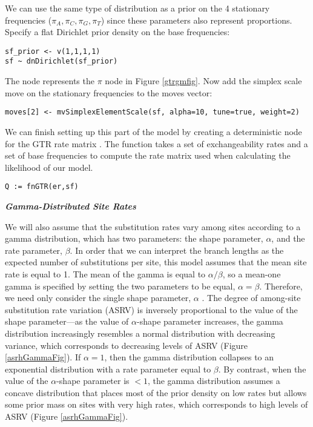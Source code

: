 We can use the same type of distribution as a prior on the 4 stationary frequencies ($\pi_A, \pi_C, \pi_G, \pi_T$) since these parameters also represent proportions. 
Specify a flat Dirichlet prior density on the base frequencies:
{\tt \begin{snugshade*}
\begin{lstlisting}
sf_prior <- v(1,1,1,1) 
sf ~ dnDirichlet(sf_prior)
\end{lstlisting}
\end{snugshade*}}

The node  represents the $\pi$ node in Figure \ref{gtrgmfig}.
Now add the simplex scale move on the stationary frequencies to the moves vector:
{\tt \small \begin{snugshade*}
\begin{lstlisting}
moves[2] <- mvSimplexElementScale(sf, alpha=10, tune=true, weight=2)  
\end{lstlisting}
\end{snugshade*}}

We can finish setting up this part of the model by creating a deterministic node for the GTR rate matrix . 
The  function takes a set of exchangeability rates and a set of base frequencies to compute the rate matrix used when calculating the likelihood of our model.
{\tt \begin{snugshade*}
\begin{lstlisting}
Q := fnGTR(er,sf)
\end{lstlisting}
\end{snugshade*}}


\textbf{\textit{Gamma-Distributed Site Rates}}


We will also assume that the substitution rates vary among sites according to a gamma distribution, which has two parameters: the shape parameter, $\alpha$, and the rate parameter, $\beta$. 
In order that we can interpret the branch lengths as the expected number of substitutions per site, this model assumes that the mean site rate is equal to 1.
The mean of the gamma is equal to $\alpha/\beta$, so a mean-one gamma is specified by setting the two parameters to be equal, $\alpha=\beta$.
Therefore, we need only consider the single shape parameter, $\alpha$ \citep{yang94a}. 
The degree of among-site substitution rate variation (ASRV) is inversely proportional to the value of the shape parameter---as the value of $\alpha$-shape parameter increases, the gamma distribution increasingly resembles a normal distribution with decreasing variance, which corresponds to decreasing levels of ASRV (Figure \ref{asrhGammaFig}).
If $\alpha = 1$, then the gamma distribution collapses to an exponential distribution with a rate parameter equal to $\beta$.
By contrast, when the value of the $\alpha$-shape parameter is $< 1$, the gamma distribution assumes a concave distribution that places most of the prior density on low rates but allows some prior mass on sites with very high rates, which corresponds to high levels of ASRV (Figure \ref{asrhGammaFig}).

